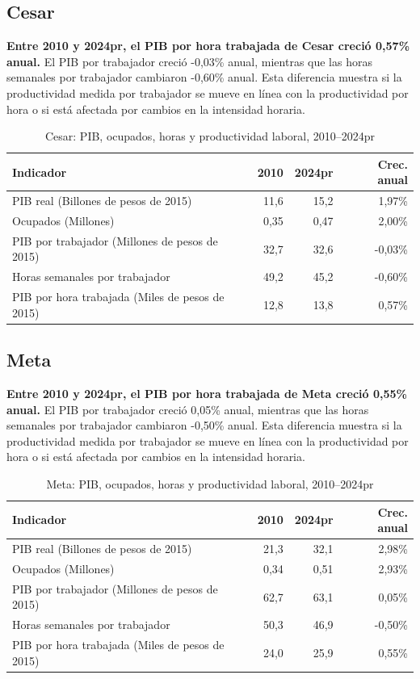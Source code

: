 \subsection{Cesar}
\textbf{Entre 2010 y 2024pr, el PIB por hora trabajada de Cesar creció 0,57\% anual.} El PIB por trabajador creció -0,03\% anual, mientras que las horas semanales por trabajador cambiaron -0,60\% anual. Esta diferencia muestra si la productividad medida por trabajador se mueve en línea con la productividad por hora o si está afectada por cambios en la intensidad horaria.
\begin{table}[H]
\centering
\caption{Cesar: PIB, ocupados, horas y productividad laboral, 2010--2024pr}
\label{tab:departamento_cesar_productividad}
\scriptsize
\begin{tabular}{lrrr}
\toprule
Indicador & 2010 & 2024pr & Crec. anual \\
\midrule
PIB real (Billones de pesos de 2015) & 11,6 & 15,2 & 1,97\% \\
Ocupados (Millones) & 0,35 & 0,47 & 2,00\% \\
PIB por trabajador (Millones de pesos de 2015) & 32,7 & 32,6 & -0,03\% \\
Horas semanales por trabajador & 49,2 & 45,2 & -0,60\% \\
PIB por hora trabajada (Miles de pesos de 2015) & 12,8 & 13,8 & 0,57\% \\
\bottomrule
\end{tabular}
\end{table}

\subsection{Meta}
\textbf{Entre 2010 y 2024pr, el PIB por hora trabajada de Meta creció 0,55\% anual.} El PIB por trabajador creció 0,05\% anual, mientras que las horas semanales por trabajador cambiaron -0,50\% anual. Esta diferencia muestra si la productividad medida por trabajador se mueve en línea con la productividad por hora o si está afectada por cambios en la intensidad horaria.
\begin{table}[H]
\centering
\caption{Meta: PIB, ocupados, horas y productividad laboral, 2010--2024pr}
\label{tab:departamento_meta_productividad}
\scriptsize
\begin{tabular}{lrrr}
\toprule
Indicador & 2010 & 2024pr & Crec. anual \\
\midrule
PIB real (Billones de pesos de 2015) & 21,3 & 32,1 & 2,98\% \\
Ocupados (Millones) & 0,34 & 0,51 & 2,93\% \\
PIB por trabajador (Millones de pesos de 2015) & 62,7 & 63,1 & 0,05\% \\
Horas semanales por trabajador & 50,3 & 46,9 & -0,50\% \\
PIB por hora trabajada (Miles de pesos de 2015) & 24,0 & 25,9 & 0,55\% \\
\bottomrule
\end{tabular}
\end{table}

